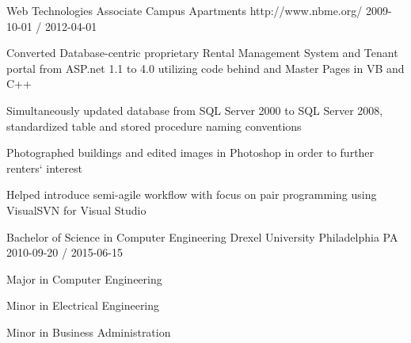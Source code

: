 \documentclass[11pt, a4paper]{awesome-cv}
\begin{document}
\begin{cventries}
  \cventry
    {Web Technologies Associate}
    {Campus Apartments}
    {http://www.nbme.org/}
    {2009-10-01 / 2012-04-01}
    {
          \begin{cvitems}
                \item{Converted Database-centric proprietary Rental Management System and Tenant portal from ASP.net 1.1 to 4.0 utilizing code behind and Master Pages in VB and C++}
                \item{Simultaneously updated database from SQL Server 2000 to SQL Server 2008, standardized table and stored procedure naming conventions}
                \item{Photographed buildings and edited images in Photoshop in order to further renters` interest}
                \item{Helped introduce semi-agile workflow with focus on pair programming using VisualSVN for Visual Studio}
          \end{cvitems}
    }
 
\end{cventries}

\begin{cventries}
 
  \cventry
    {Bachelor of Science in Computer Engineering}
    {Drexel University}
    {Philadelphia PA}
    {2010-09-20 / 2015-06-15}
    {
          \begin{cvitems}
                \item{Major in Computer Engineering}
                \item{Minor in Electrical Engineering}
                \item{Minor in Business Administration}
          \end{cvitems}
    }
 
\end{cventries}

\end{document}
